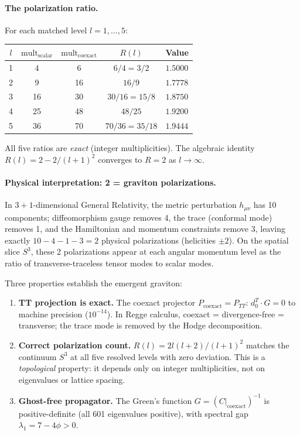 \documentclass[12pt,a4paper]{article}
\theoremstyle{definition}
\begin{document}
\paragraph{The polarization ratio.}
For each matched level $l = 1, \ldots, 5$:
\begin{center}
\begin{tabular}{ccccl}
\toprule
$l$ & $\mathrm{mult}_{\mathrm{scalar}}$ & $\mathrm{mult}_{\mathrm{coexact}}$ & $R(l)$ & Value \\
\midrule
1 & 4  & 6   & $6/4 = 3/2$     & $1.5000$ \\
2 & 9  & 16  & $16/9$           & $1.7778$ \\
3 & 16 & 30  & $30/16 = 15/8$   & $1.8750$ \\
4 & 25 & 48  & $48/25$          & $1.9200$ \\
5 & 36 & 70  & $70/36 = 35/18$  & $1.9444$ \\
\bottomrule
\end{tabular}
\end{center}
All five ratios are \emph{exact} (integer multiplicities).  The algebraic identity $R(l) = 2 - 2/(l+1)^2$ converges to $R = 2$ as $l \to \infty$.

\paragraph{Physical interpretation: 2 = graviton polarizations.}
In $3\!+\!1$-dimensional General Relativity, the metric perturbation $h_{\mu\nu}$ has 10 components; diffeomorphism gauge removes 4, the trace (conformal mode) removes 1, and the Hamiltonian and momentum constraints remove 3, leaving exactly $10 - 4 - 1 - 3 = 2$ physical polarizations (helicities $\pm 2$).  On the spatial slice $S^3$, these 2 polarizations appear at each angular momentum level as the ratio of transverse-traceless tensor modes to scalar modes.

Three properties establish the emergent graviton:
\begin{enumerate}
\item \textbf{TT projection is exact.}  The coexact projector $P_{\mathrm{coexact}} = P_{TT}$: $d_0^T \cdot G = 0$ to machine precision ($10^{-14}$).  In Regge calculus, coexact = divergence-free = transverse; the trace mode is removed by the Hodge decomposition.

\item \textbf{Correct polarization count.}  $R(l) = 2l(l+2)/(l+1)^2$ matches the continuum $S^3$ at all five resolved levels with zero deviation.  This is a \emph{topological} property: it depends only on integer multiplicities, not on eigenvalues or lattice spacing.

\item \textbf{Ghost-free propagator.}  The Green's function $G = (C|_{\mathrm{coexact}})^{-1}$ is positive-definite (all 601 eigenvalues positive), with spectral gap $\lambda_1 = 7 - 4\phi > 0$.
\end{enumerate}
\end{document}
